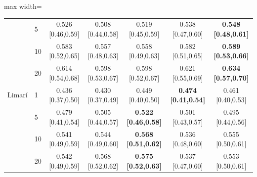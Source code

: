 \begin{table}[ht]
\begin{adjustbox}{max width=\textwidth}
\begin{tabular}{llccccc}
                   & 5  & 0.526 [0.46,0.59] & 0.508 [0.44,0.58] & 0.519 [0.45,0.59] & 0.538 [0.47,0.60] & \textbf{0.548 [0.48,0.61]} \\
                   & 10 & 0.583 [0.52,0.65] & 0.557 [0.48,0.63] & 0.558 [0.49,0.63] & 0.582 [0.51,0.65] & \textbf{0.589 [0.53,0.66]} \\
                   & 20 & 0.614 [0.54,0.68] & 0.598 [0.53,0.67] & 0.598 [0.52,0.67] & 0.621 [0.55,0.69] & \textbf{0.634 [0.57,0.70]} \\
        \midrule
        Limar\'i   & 1  & 0.436 [0.37,0.50] & 0.430 [0.37,0.49] & 0.449 [0.40,0.50] & \textbf{0.474 [0.41,0.54]} & 0.461 [0.40,0.53] \\
                   & 5  & 0.479 [0.41,0.54] & 0.505 [0.44,0.57] & \textbf{0.522 [0.46,0.58]} & 0.501 [0.43,0.57] & 0.495 [0.44,0.56] \\
                   & 10 & 0.541 [0.49,0.59] & 0.544 [0.49,0.60] & \textbf{0.568 [0.51,0.62]} & 0.536 [0.48,0.60] & 0.555 [0.50,0.61] \\
                   & 20 & 0.542 [0.49,0.59] & 0.568 [0.52,0.62] & \textbf{0.575 [0.52,0.63]} & 0.537 [0.47,0.60] & 0.553 [0.50,0.61] \\
        \bottomrule
    \end{tabular}
    \end{adjustbox}
\end{table}

